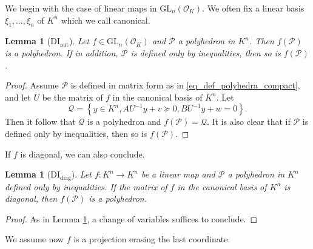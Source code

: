 \documentclass[sigconf]{acmart}
\newcommand{\PP}{\mathcal{P}}
\newcommand{\Qc}{\mathcal{Q}}
\newtheorem{lemma}[theorem]{Lemma}
\newcommand{\OK}{\mathcal{O}_K}
\newcommand{\GL}{\mathrm{GL}}
\begin{document}
We begin with the case of linear maps in $\GL_n(\OK)$.
We often fix a linear basis $\xi_1,\ldots,\xi_n$ of $K^n$ which we call canonical.

\begin{lemma}[DI${}_{\mathrm{aut}}$]
Let $f \in \GL_n(\OK)$ and $\PP$ a polyhedron in $K^n$.
Then $f(\PP)$ is a polyhedron. \label{lem:DIaut}
If in addition, $\PP$ is defined only by inequalities,
then so is $f(\PP)$.
\end{lemma}
\begin{proof}
  Assume $\PP$ is defined in matrix form as in \eqref{eq_def_polyhedra_compact},
  and let $U$ be the matrix of
  $f$ in the canonical basis of $K^n$. Let
  \[\Qc=\left\lbrace y \in K^n,  AU^{-1} y+v \succeq 0, BU^{-1} y+w=0 \right\rbrace.\]
  Then it follow that $\Qc$ is a polyhedron and $f(\PP)=\Qc.$
  It is also clear that if $\PP$ is defined only by inequalities,
  then so is $f(\PP)$.
\end{proof}

If $f$ is diagonal, we can also conclude.

\begin{lemma}[DI${}_{\mathrm{diag}}$]
  Let $f : K^n \to K^n$ be a linear map and $\PP$ a polyhedron in $K^n$ defined only by inequalities.
  If the matrix of $f$ in the canonical basis of $K^n$ is diagonal,
  then $f(\PP)$ is a polyhedron. \label{lem:DIdiag}
\end{lemma}
\begin{proof}
As in Lemma \ref{lem:DIaut}, a change of variables suffices to conclude.
\end{proof}

We assume now $f$ is a projection erasing the last coordinate.
\end{document}
